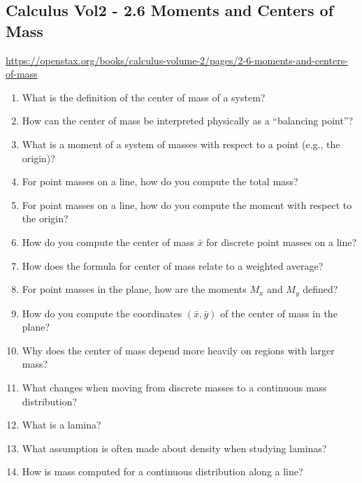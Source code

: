 \subsection{Calculus Vol2 - 2.6 Moments and Centers of Mass}

\url{https://openstax.org/books/calculus-volume-2/pages/2-6-moments-and-centers-of-mass}

\begin{enumerate}

\item What is the definition of the center of mass of a system?

\item How can the center of mass be interpreted physically as a “balancing point”?

\item What is a moment of a system of masses with respect to a point (e.g., the origin)?

\item For point masses on a line, how do you compute the total mass?

\item For point masses on a line, how do you compute the moment with respect to the origin?

\item How do you compute the center of mass $\bar{x}$ for discrete point masses on a line?

\item How does the formula for center of mass relate to a weighted average?

\item For point masses in the plane, how are the moments $M_x$ and $M_y$ defined?

\item How do you compute the coordinates $(\bar{x}, \bar{y})$ of the center of mass in the plane?

\item Why does the center of mass depend more heavily on regions with larger mass?

\item What changes when moving from discrete masses to a continuous mass distribution?

\item What is a lamina?

\item What assumption is often made about density when studying laminas?

\item How is mass computed for a continuous distribution along a line?


\end{enumerate}
